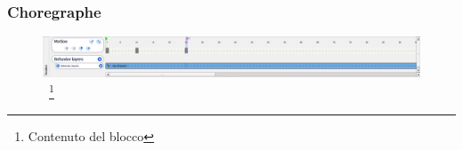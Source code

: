 \documentclass[aspectratio=169]{beamer}
\begin{document}
\begin{frame}
\frametitle{Choregraphe}
\begin{figure}[ht]
\begin{center}
\includegraphics[width=\textwidth]{timeline}
~\footnote{Contenuto del blocco}
\end{center}
\end{figure}
\end{frame}

\ifx\fulldocument\undefined
\end{document}
